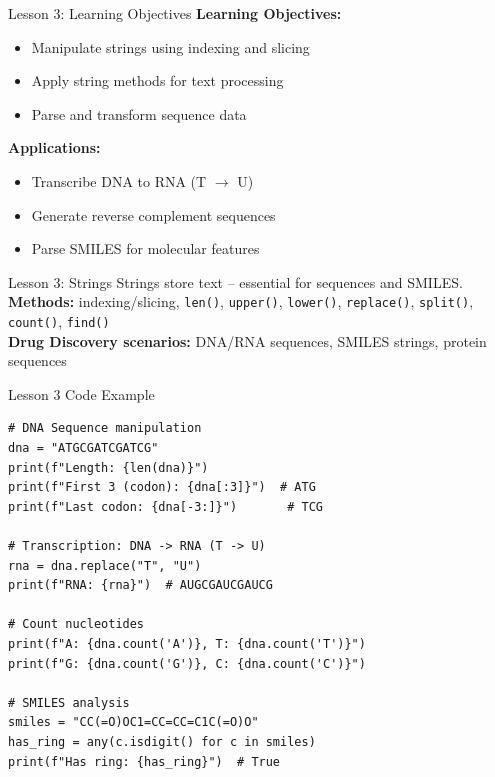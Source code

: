 \documentclass{beamer}
\begin{document}
\begin{frame}{Lesson 3: Learning Objectives}
    \small
    \textbf{Learning Objectives:}
    \begin{itemize}
        \item Manipulate strings using indexing and slicing
        \item Apply string methods for text processing
        \item Parse and transform sequence data
    \end{itemize}
    \vspace{0.5em}
    \textbf{Applications:}
    \begin{itemize}
        \item Transcribe DNA to RNA (T $\to$ U)
        \item Generate reverse complement sequences
        \item Parse SMILES for molecular features
    \end{itemize}
\end{frame}

\begin{frame}{Lesson 3: Strings}
    \small
    Strings store text -- essential for sequences and SMILES.\\[0.5em]
    \textbf{Methods:} indexing/slicing, \texttt{len()}, \texttt{upper()}, \texttt{lower()}, \texttt{replace()}, \texttt{split()}, \texttt{count()}, \texttt{find()}\\[0.5em]
    \textbf{Drug Discovery scenarios:} DNA/RNA sequences, SMILES strings, protein sequences
\end{frame}

\begin{frame}[fragile]{Lesson 3 Code Example}
    \small
    \begin{lstlisting}[style=codeStyle]
# DNA Sequence manipulation
dna = "ATGCGATCGATCG"
print(f"Length: {len(dna)}")
print(f"First 3 (codon): {dna[:3]}")  # ATG
print(f"Last codon: {dna[-3:]}")       # TCG

# Transcription: DNA -> RNA (T -> U)
rna = dna.replace("T", "U")
print(f"RNA: {rna}")  # AUGCGAUCGAUCG

# Count nucleotides
print(f"A: {dna.count('A')}, T: {dna.count('T')}")
print(f"G: {dna.count('G')}, C: {dna.count('C')}")

# SMILES analysis
smiles = "CC(=O)OC1=CC=CC=C1C(=O)O"
has_ring = any(c.isdigit() for c in smiles)
print(f"Has ring: {has_ring}")  # True
    \end{lstlisting}
\end{frame}
\end{document}
